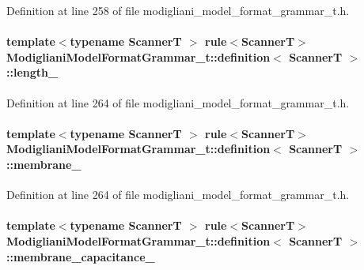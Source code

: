 Definition at line 258 of file modigliani\_\-model\_\-format\_\-grammar\_\-t.h.

\paragraph[{length\_\-}]{\setlength{\rightskip}{0pt plus 5cm}template$<$typename ScannerT $>$ rule$<$ScannerT$>$ {\bf ModiglianiModelFormatGrammar\_\-t::definition}$<$ ScannerT $>$::{\bf length\_\-}}\hfill\label{struct_modigliani_model_format_grammar__t_1_1definition_a5cd46069fcf29afd54f96f0fbb2366c4}


Definition at line 264 of file modigliani\_\-model\_\-format\_\-grammar\_\-t.h.

\paragraph[{membrane\_\-}]{\setlength{\rightskip}{0pt plus 5cm}template$<$typename ScannerT $>$ rule$<$ScannerT$>$ {\bf ModiglianiModelFormatGrammar\_\-t::definition}$<$ ScannerT $>$::{\bf membrane\_\-}}\hfill\label{struct_modigliani_model_format_grammar__t_1_1definition_abbe4599d73fa9f7c542b824b7af164c2}


Definition at line 264 of file modigliani\_\-model\_\-format\_\-grammar\_\-t.h.

\paragraph[{membrane\_\-capacitance\_\-}]{\setlength{\rightskip}{0pt plus 5cm}template$<$typename ScannerT $>$ rule$<$ScannerT$>$ {\bf ModiglianiModelFormatGrammar\_\-t::definition}$<$ ScannerT $>$::{\bf membrane\_\-capacitance\_\-}}\hfill\label{struct_modigliani_model_format_grammar__t_1_1definition_a916defa498620899b23876685b130d78}


